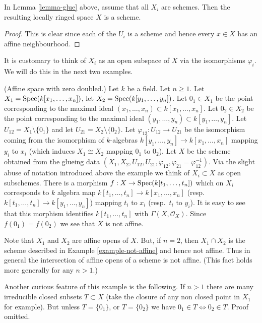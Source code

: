 \begin{lemma}
\label{lemma-glue-schemes}
In Lemma \ref{lemma-glue} above, assume that all
$X_i$ are schemes. Then the resulting locally ringed
space $X$ is a scheme.
\end{lemma}

\begin{proof}
This is clear since each of the $U_i$ is a scheme
and hence every $x \in X$ has an affine neighbourhood.
\end{proof}

\noindent
It is customary to think of $X_i$ as an open subspace of
$X$ via the isomorphisms $\varphi_i$. We will do this in
the next two examples.

\begin{example}
\label{example-affine-space-zero-doubled}
(Affine space with zero doubled.)
Let $k$ be a field. Let $n \geq 1$.
Let $X_1 = \mathop{\rm Spec}(k[x_1, \ldots, x_n])$,
let $X_2 = \mathop{\rm Spec}(k[y_1, \ldots, y_n])$.
Let $0_1 \in X_1$ be the point corresponding to the maximal ideal
$(x_1, \ldots, x_n) \subset k[x_1, \ldots, x_n]$.
Let $0_2 \in X_2$ be the point corresponding to the maximal ideal
$(y_1, \ldots, y_n) \subset k[y_1, \ldots, y_n]$.
Let $U_{12} = X_1 \setminus \{0_1\}$ and
let $U_{21} = X_2 \setminus \{0_2\}$. Let
$\varphi_{12} : U_{12} \to U_{21}$ be the isomorphism
coming from the isomorphism of $k$-algebras
$k[y_1, \ldots, y_n] \to k[x_1, \ldots, x_n]$
mapping $y_i$ to $x_i$ (which induces $X_1 \cong X_2$ mapping
$0_1$ to $0_2$).
Let $X$ be the scheme obtained from the glueing data
$(X_1, X_2, U_{12}, U_{21}, \varphi_{12},
\varphi_{21} = \varphi_{12}^{-1})$. Via the slight abuse
of notation introduced above the example we think of
$X_i \subset X$ as open subschemes.
There is a morphism $f : X \to \mathop{\rm Spec}(k[t_1, \ldots, t_n])$
which on $X_i$ corresponds to $k$ algebra map
$k[t_1, \ldots, t_n] \to k[x_1, \ldots, x_n]$
(resp.\ $k[t_1, \ldots, t_n] \to k[y_1, \ldots, y_n]$)
mapping $t_i$ to $x_i$ (resp.\  $t_i$ to $y_i$).
It is easy to see that this morphism identifies
$k[t_1, \ldots, t_n]$ with $\Gamma(X, \mathcal{O}_X)$. Since
$f(0_1) = f(0_2)$ we see that $X$ is not affine.

\medskip\noindent
Note that $X_1$ and $X_2$ are affine opens of $X$.
But, if $n = 2$, then $X_1 \cap X_2$ is the scheme
described in Example \ref{example-not-affine} and hence not affine.
Thus in general the intersection of affine opens of a scheme
is not affine. (This fact holds more generally for any $n > 1$.)

\medskip\noindent
Another curious feature of this example is the following.
If $n > 1$ there are many irreducible closed subsets $T \subset X$
(take the closure of any non closed point in $X_1$ for example).
But unless $T = \{0_1\}$, or $T = \{0_2\}$ we have
$0_1 \in T \Leftrightarrow 0_2 \in T$. Proof omitted.
\end{example}

